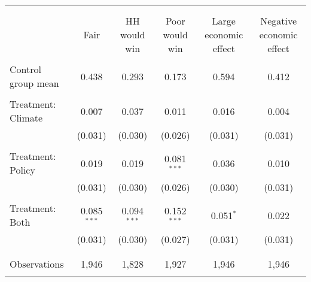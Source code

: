 
\begin{tabular}{@{\extracolsep{5pt}}lccccc} 
\\[-1.8ex]\hline 
\hline \\[-1.8ex] 
\\[-1.8ex] & Fair & HH would win & Poor would win & Large economic effect & Negative economic effect \\ 
\hline \\[-1.8ex] 
 Control group mean & 0.438 & 0.293 & 0.173 & 0.594 & 0.412  \\ \hline \\[-1.8ex] Treatment: Climate & 0.007 & 0.037 & 0.011 & 0.016 & 0.004 \\ 
  & (0.031) & (0.030) & (0.026) & (0.031) & (0.031) \\ 
  & & & & & \\ 
 Treatment: Policy & 0.019 & 0.019 & 0.081$^{***}$ & 0.036 & 0.010 \\ 
  & (0.031) & (0.030) & (0.026) & (0.030) & (0.031) \\ 
  & & & & & \\ 
 Treatment: Both & 0.085$^{***}$ & 0.094$^{***}$ & 0.152$^{***}$ & 0.051$^{*}$ & 0.022 \\ 
  & (0.031) & (0.030) & (0.027) & (0.031) & (0.031) \\ 
  & & & & & \\ 
\hline \\[-1.8ex] 

Observations & 1,946 & 1,828 & 1,927 & 1,946 & 1,946 \\ 
\hline 
\hline \\[-1.8ex] 
\end{tabular} 